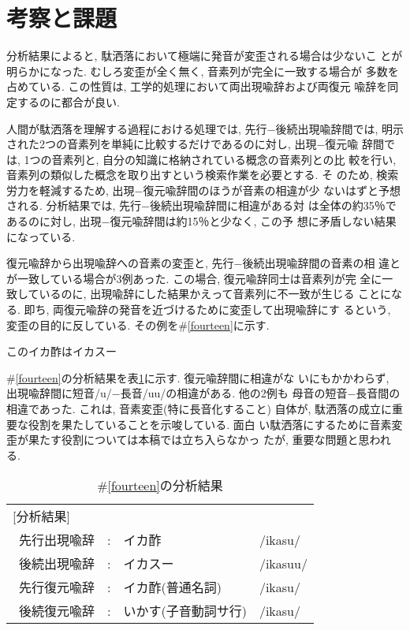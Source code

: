 \vspace{-0.3mm}
\section{考察と課題}

分析結果によると, 駄洒落において極端に発音が変歪される場合は少ないこ
とが明らかになった. むしろ変歪が全く無く, 音素列が完全に一致する場合が
多数を占めている. この性質は, 工学的処理において両出現喩辞および両復元
喩辞を同定するのに都合が良い.

人間が駄洒落を理解する過程における処理では, 先行−後続出現喩辞間では, 
明示された2つの音素列を単純に比較するだけであるのに対し, 出現−復元喩
辞間では, 1つの音素列と, 自分の知識に格納されている概念の音素列との比
較を行い, 音素列の類似した概念を取り出すという検索作業を必要とする. そ
のため, 検索労力を軽減するため, 出現−復元喩辞間のほうが音素の相違が少
ないはずと予想される. 分析結果では, 先行−後続出現喩辞間に相違がある対
は全体の約35％であるのに対し, 出現−復元喩辞間は約15％と少なく, この予
想に矛盾しない結果になっている.

復元喩辞から出現喩辞への音素の変歪と, 先行−後続出現喩辞間の音素の相
違とが一致している場合が3例あった. この場合, 復元喩辞同士は音素列が完
全に一致しているのに, 出現喩辞にした結果かえって音素列に不一致が生じる
ことになる. 即ち, 両復元喩辞の発音を近づけるために変歪して出現喩辞にす
るという, 変歪の目的に反している. その例を\#\ref{fourteen}に示す.  

\vspace*{1em}\begin{sample}
\item このイカ酢はイカスー \label{fourteen}
\end{sample}\vspace*{1em}
\#\ref{fourteen}の分析結果を表\ref{result}に示す. 復元喩辞間に相違がな
いにもかかわらず, 出現喩辞間に短音/u/−長音/uu/の相違がある. 他の2例も
母音の短音−長音間の相違であった. これは, 音素変歪(特に長音化すること)
自体が, 駄洒落の成立に重要な役割を果たしていることを示唆している. 面白
い駄洒落にするために音素変歪が果たす役割については本稿では立ち入らなかっ
たが, 重要な問題と思われる.

\begin{table}
\begin{center}
\caption{\#\ref{fourteen}の分析結果}\label{result}
\begin{tabular}{lcll}
[分析結果] &&&\\
\ 先行出現喩辞 & : & イカ酢 & /ikasu/\\
\ 後続出現喩辞 & : & イカスー & /ikasuu/\\
\ 先行復元喩辞 & : & イカ酢(普通名詞) & /ikasu/\\
\ 後続復元喩辞 & : & いかす(子音動詞サ行) & /ikasu/\\
\end{tabular}
\end{center}
\end{table}

